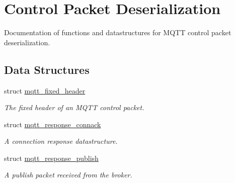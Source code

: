 \hypertarget{group__unpackers}{}\section{Control Packet Deserialization}
\label{group__unpackers}


Documentation of functions and datastructures for M\+Q\+TT control packet deserialization.  


\subsection*{Data Structures}
\begin{DoxyCompactItemize}
\item 
struct \hyperlink{structmqtt__fixed__header}{mqtt\+\_\+fixed\+\_\+header}
\begin{DoxyCompactList}\small\item\em The fixed header of an M\+Q\+TT control packet. \end{DoxyCompactList}\item 
struct \hyperlink{structmqtt__response__connack}{mqtt\+\_\+response\+\_\+connack}
\begin{DoxyCompactList}\small\item\em A connection response datastructure. \end{DoxyCompactList}\item 
struct \hyperlink{structmqtt__response__publish}{mqtt\+\_\+response\+\_\+publish}
\begin{DoxyCompactList}\small\item\em A publish packet received from the broker.


\end{DoxyCompactList}
\end{DoxyCompactItemize}
